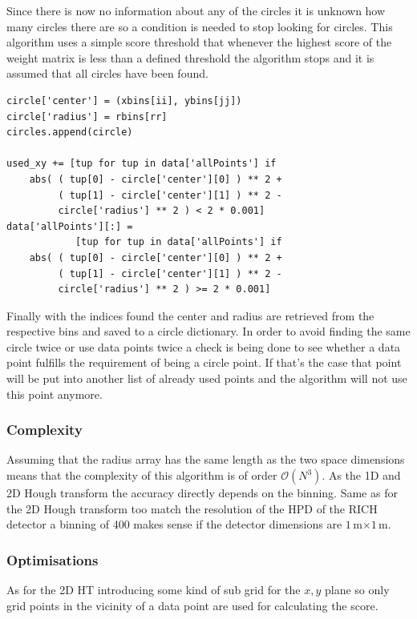 \documentclass[11pt,twoside]{scrreprt}
\begin{document}
Since there is now no information about any of the circles it is unknown how many circles there are so a condition is needed to stop looking for circles.
This algorithm uses a simple score threshold that whenever the highest score
of the weight matrix is less than a defined threshold the algorithm stops
and it is assumed that all circles have been found.
\begin{lstlisting}
circle['center'] = (xbins[ii], ybins[jj])
circle['radius'] = rbins[rr]
circles.append(circle)

used_xy += [tup for tup in data['allPoints'] if
    abs( ( tup[0] - circle['center'][0] ) ** 2 +
         ( tup[1] - circle['center'][1] ) ** 2 -
         circle['radius'] ** 2 ) < 2 * 0.001]
data['allPoints'][:] = 
            [tup for tup in data['allPoints'] if 
    abs( ( tup[0] - circle['center'][0] ) ** 2 + 
         ( tup[1] - circle['center'][1] ) ** 2 - 
         circle['radius'] ** 2 ) >= 2 * 0.001]  
\end{lstlisting}
Finally with the indices found the center and radius are retrieved
from the respective bins and saved to a circle dictionary. In order to
avoid finding the same circle twice or use data points twice a check
is being done to see whether a data point fulfills the requirement
of being a circle point. If that's the case that point will be put
into another list of already used points and the algorithm will not 
use this point anymore.
\subsubsection{Complexity} %
\label{ssub:complexity}
Assuming that the radius array has the same length as the two space
dimensions means that the complexity of this algorithm is of order 
$\mathcal{O}(N^3)$. As the 1D and 2D Hough transform the accuracy
directly depends on the binning. Same as for the 2D Hough transform
too match the resolution of the HPD of the RICH detector a binning of 400 makes sense if the detector dimensions are $1$\,m$\times1$\,m.

\subsubsection{Optimisations} %
\label{ssub:optimisations}
As for the 2D HT introducing some kind of sub grid for the $x,y$ 
plane so only grid points in the vicinity of a data point are used
for calculating the score.
\end{document}
